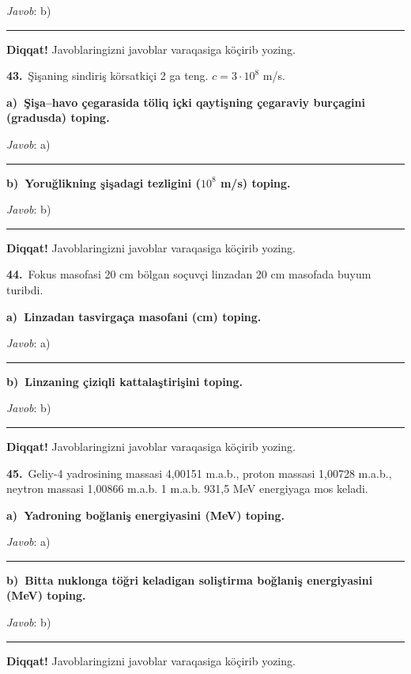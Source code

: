 \documentclass[11pt,a4paper]{article}
\newcommand{\blank}{\rule{5cm}{0.4pt}}
\begin{document}
\noindent\textit{Javob}: b)\ \blank\par
\medskip\noindent\textbf{Diqqat!} Javoblaringizni javoblar varaqasiga köçirib yozing.\par\vspace{10pt}
\noindent\textbf{43.}\ Şişaning sindiriş körsatkiçi 2 ga teng. $c=3\cdot10^8$ m/s.\par\smallskip
\medskip\noindent\textbf{a)\ Şişa–havo çegarasida töliq içki qaytişning çegaraviy burçagini (gradusda) toping.}\par
\noindent\textit{Javob}: a)\ \blank\par
\medskip\noindent\textbf{b)\ Yoruğlikning şişadagi tezligini ($10^8$ m/s) toping.}\par
\noindent\textit{Javob}: b)\ \blank\par
\medskip\noindent\textbf{Diqqat!} Javoblaringizni javoblar varaqasiga köçirib yozing.\par\vspace{10pt}
\noindent\textbf{44.}\ Fokus masofasi 20 cm bölgan soçuvçi linzadan 20 cm masofada buyum turibdi.\par\smallskip
\medskip\noindent\textbf{a)\ Linzadan tasvirgaça masofani (cm) toping.}\par
\noindent\textit{Javob}: a)\ \blank\par
\medskip\noindent\textbf{b)\ Linzaning çiziqli kattalaştirişini toping.}\par
\noindent\textit{Javob}: b)\ \blank\par
\medskip\noindent\textbf{Diqqat!} Javoblaringizni javoblar varaqasiga köçirib yozing.\par\vspace{10pt}
\noindent\textbf{45.}\ Geliy-4 yadrosining massasi 4,00151 m.a.b., proton massasi 1,00728 m.a.b., neytron massasi 1,00866 m.a.b. 1 m.a.b. 931,5 MeV energiyaga mos keladi.\par\smallskip
\medskip\noindent\textbf{a)\ Yadroning boğlaniş energiyasini (MeV) toping.}\par
\noindent\textit{Javob}: a)\ \blank\par
\medskip\noindent\textbf{b)\ Bitta nuklonga töğri keladigan soliştirma boğlaniş energiyasini (MeV) toping.}\par
\noindent\textit{Javob}: b)\ \blank\par
\medskip\noindent\textbf{Diqqat!} Javoblaringizni javoblar varaqasiga köçirib yozing.\par\vspace{10pt}
\end{document}
